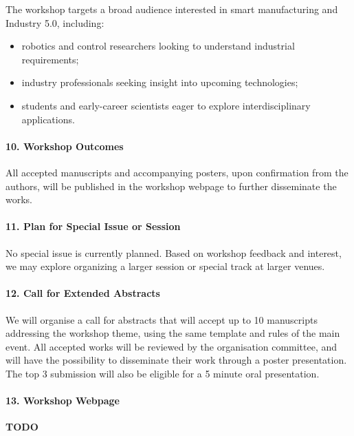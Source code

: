 \documentclass{article}
\begin{document}
The workshop targets a broad audience interested in smart manufacturing and Industry 5.0, including:
\begin{itemize}
    \item robotics and control researchers looking to understand industrial requirements;
    \item industry professionals seeking insight into upcoming technologies;
    \item students and early-career scientists eager to explore interdisciplinary applications.
\end{itemize}



\paragraph{10. Workshop Outcomes}
All accepted manuscripts and accompanying posters, upon confirmation from the authors, will be published in the workshop webpage to further disseminate the works.


\paragraph{11. Plan for Special Issue or Session}
No special issue is currently planned. 
Based on workshop feedback and interest, we may explore organizing a larger session or special track at larger venues.


\paragraph{12. Call for Extended Abstracts} 
We will organise a call for abstracts that will accept up to 10 manuscripts addressing the workshop theme, using the same template and rules of the main event.
All accepted works will be reviewed by the organisation committee, and will have the possibility to disseminate their work through a poster presentation.
The top 3 submission will also be eligible for a 5 minute oral presentation.


\paragraph{13. Workshop Webpage} \textbf{TODO}
\end{document}
